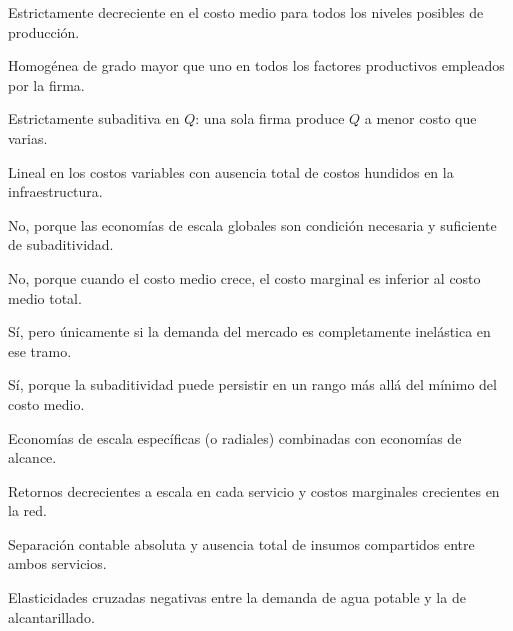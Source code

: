 \begin{opts}
    \item Estrictamente decreciente en el costo medio para todos los niveles posibles de producción.
    \item Homogénea de grado mayor que uno en todos los factores productivos empleados por la firma.
    \item Estrictamente subaditiva en $Q$: una sola firma produce $Q$ a menor costo que varias.
    \item Lineal en los costos variables con ausencia total de costos hundidos en la infraestructura.
\end{opts}

\begin{opts}
    \item No, porque las economías de escala globales son condición necesaria y suficiente de subaditividad.
    \item No, porque cuando el costo medio crece, el costo marginal es inferior al costo medio total.
    \item Sí, pero únicamente si la demanda del mercado es completamente inelástica en ese tramo.
    \item Sí, porque la subaditividad puede persistir en un rango más allá del mínimo del costo medio.
\end{opts}

\begin{opts}
    \item Economías de escala específicas (o radiales) combinadas con economías de alcance.
    \item Retornos decrecientes a escala en cada servicio y costos marginales crecientes en la red.
    \item Separación contable absoluta y ausencia total de insumos compartidos entre ambos servicios.
    \item Elasticidades cruzadas negativas entre la demanda de agua potable y la de alcantarillado.
\end{opts}

